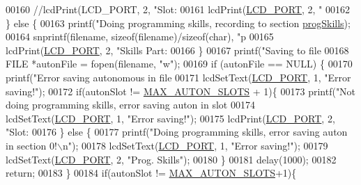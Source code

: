 \begin{DoxyCode}
{{{{{{{{00160         \textcolor{comment}{//lcdPrint(LCD\_PORT, 2, "Slot: %
00161         lcdPrint(\hyperlink{lcdmsg_8h_abcf42bd88b3c36193f301ca25b033875}{LCD\_PORT}, 2, \textcolor{stringliteral}{"%
00162     \} \textcolor{keywordflow}{else} \{
00163         printf(\textcolor{stringliteral}{"Doing programming skills, recording to section %
      \hyperlink{autonrecorder_8c_aa2eda471576bdbaf33835a71da9bc616}{progSkills});
00164         snprintf(filename, \textcolor{keyword}{sizeof}(filename)/\textcolor{keyword}{sizeof}(\textcolor{keywordtype}{char}), \textcolor{stringliteral}{"p%
00165         lcdPrint(\hyperlink{lcdmsg_8h_abcf42bd88b3c36193f301ca25b033875}{LCD\_PORT}, 2, \textcolor{stringliteral}{"Skills Part: %
00166     \}
00167     printf(\textcolor{stringliteral}{"Saving to file %
00168     FILE *autonFile = fopen(filename, \textcolor{stringliteral}{"w"});
00169     \textcolor{keywordflow}{if} (autonFile == NULL) \{
00170         printf(\textcolor{stringliteral}{"Error saving autonomous in file %
00171         lcdSetText(\hyperlink{lcdmsg_8h_abcf42bd88b3c36193f301ca25b033875}{LCD\_PORT}, 1, \textcolor{stringliteral}{"Error saving!"});
00172         \textcolor{keywordflow}{if}(autonSlot != \hyperlink{autonrecorder_8h_a5173a11a545cb4020fdd139552dc15c1}{MAX\_AUTON\_SLOTS} + 1)\{
00173             printf(\textcolor{stringliteral}{"Not doing programming skills, error saving auton in slot %
00174             lcdSetText(\hyperlink{lcdmsg_8h_abcf42bd88b3c36193f301ca25b033875}{LCD\_PORT}, 1, \textcolor{stringliteral}{"Error saving!"});
00175             lcdPrint(\hyperlink{lcdmsg_8h_abcf42bd88b3c36193f301ca25b033875}{LCD\_PORT}, 2,   \textcolor{stringliteral}{"Slot: %
00176         \} \textcolor{keywordflow}{else} \{
00177             printf(\textcolor{stringliteral}{"Doing programming skills, error saving auton in section 0!\(\backslash\)n"});
00178             lcdSetText(\hyperlink{lcdmsg_8h_abcf42bd88b3c36193f301ca25b033875}{LCD\_PORT}, 1, \textcolor{stringliteral}{"Error saving!"});
00179             lcdSetText(\hyperlink{lcdmsg_8h_abcf42bd88b3c36193f301ca25b033875}{LCD\_PORT}, 2, \textcolor{stringliteral}{"Prog. Skills"});
00180         \}
00181         delay(1000);
00182         \textcolor{keywordflow}{return};
00183     \}
00184     \textcolor{keywordflow}{if}(autonSlot != \hyperlink{autonrecorder_8h_a5173a11a545cb4020fdd139552dc15c1}{MAX\_AUTON\_SLOTS}+1)\{
}}}}}}}}}}}}}}}}}
\end{DoxyCode}
